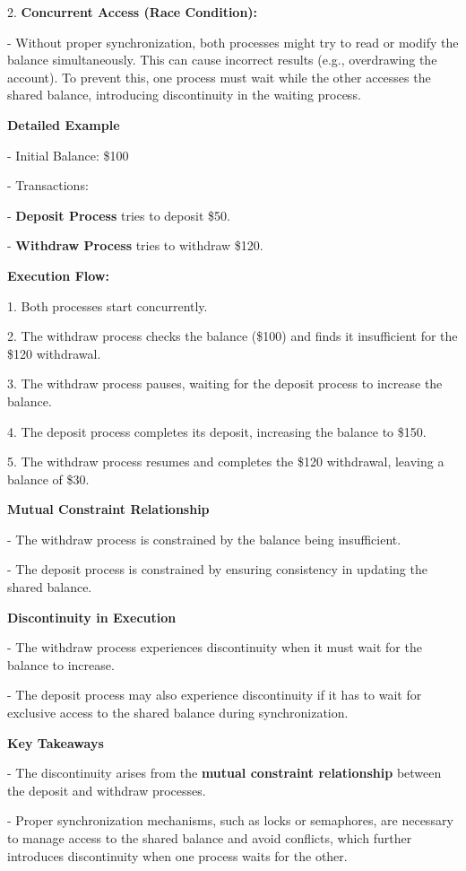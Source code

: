 \documentclass[a4paper]{book}
\begin{document}
2. \textbf{Concurrent Access (Race Condition):}

   - Without proper synchronization, both processes might try to read or modify the balance simultaneously. This can cause incorrect results (e.g., overdrawing the account). To prevent this, one process must wait while the other accesses the shared balance, introducing discontinuity in the waiting process.

\textbf{Detailed Example}

- Initial Balance: \$100

- Transactions:  

	- \textbf{Deposit Process} tries to deposit \$50.
	
  	- \textbf{Withdraw Process} tries to withdraw \$120.

\textbf{Execution Flow:}

1. Both processes start concurrently.

2. The withdraw process checks the balance (\$100) and finds it insufficient for the \$120 withdrawal.

3. The withdraw process pauses, waiting for the deposit process to increase the balance.

4. The deposit process completes its deposit, increasing the balance to \$150.

5. The withdraw process resumes and completes the \$120 withdrawal, leaving a balance of \$30.

\textbf{Mutual Constraint Relationship}

- The withdraw process is constrained by the balance being insufficient.

- The deposit process is constrained by ensuring consistency in updating the shared balance.

\textbf{Discontinuity in Execution}

- The withdraw process experiences discontinuity when it must wait for the balance to increase.

- The deposit process may also experience discontinuity if it has to wait for exclusive access to the shared balance during synchronization.

\textbf{Key Takeaways}

- The discontinuity arises from the \textbf{mutual constraint relationship} between the deposit and withdraw processes.

- Proper synchronization mechanisms, such as locks or semaphores, are necessary to manage access to the shared balance and avoid conflicts, which further introduces discontinuity when one process waits for the other.
\end{document}
